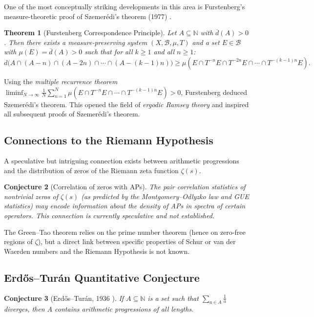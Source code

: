 \documentclass[12pt,a4paper]{amsart}
\newtheorem{theorem}{Theorem}[section]
\newtheorem{conjecture}[theorem]{Conjecture}
\theoremstyle{definition}
\newcommand{\N}{\mathbb{N}}
\begin{document}
One of the most conceptually striking developments in this area is Furstenberg's
measure-theoretic proof of Szemer\'edi's theorem (1977) \cite{Furstenberg1977}.

\begin{theorem}[Furstenberg Correspondence Principle]
Let $A \subseteq \N$ with $\overline{d}(A) > 0$. Then there exists a measure-preserving
system $(X, \mathcal{B}, \mu, T)$ and a set $E \in \mathcal{B}$ with $\mu(E) = \overline{d}(A) > 0$
such that for all $k \geq 1$ and all $n \geq 1$:
\[
  d\bigl(A \cap (A-n) \cap (A-2n) \cap \cdots \cap (A-(k-1)n)\bigr) \geq
  \mu(E \cap T^{-n}E \cap T^{-2n}E \cap \cdots \cap T^{-(k-1)n}E).
\]
\end{theorem}

Using the \emph{multiple recurrence theorem}
$\liminf_{N\to\infty} \frac{1}{N}\sum_{n=1}^N \mu(E \cap T^{-n}E \cap \cdots \cap T^{-(k-1)n}E) > 0$,
Furstenberg deduced Szemer\'edi's theorem. This opened the field of \emph{ergodic
Ramsey theory} and inspired all subsequent proofs of Szemer\'edi's theorem.

\subsection{Connections to the Riemann Hypothesis}

A speculative but intriguing connection exists between arithmetic progressions and the
distribution of zeros of the Riemann zeta function $\zeta(s)$.

\begin{conjecture}[Correlation of zeros with APs]\label{conj:rh-ap}
The pair correlation statistics of nontrivial zeros of $\zeta(s)$ (as predicted by the
Montgomery--Odlyzko law and GUE statistics) may encode information about the density of
APs in spectra of certain operators. This connection is currently speculative and not established.
\end{conjecture}

The Green--Tao theorem relies on the prime number theorem (hence on zero-free regions of
$\zeta$), but a direct link between specific properties of Schur or van der Waerden numbers
and the Riemann Hypothesis is not known.

\subsection{Erd\H{o}s--Tur\'an Quantitative Conjecture}

\begin{conjecture}[Erd\H{o}s--Tur\'an, 1936 \cite{ErdosTuran1936}]
If $A \subseteq \N$ is a set such that $\sum_{a \in A} \frac{1}{a}$ diverges, then $A$
contains arithmetic progressions of all lengths.
\end{conjecture}
\end{document}
